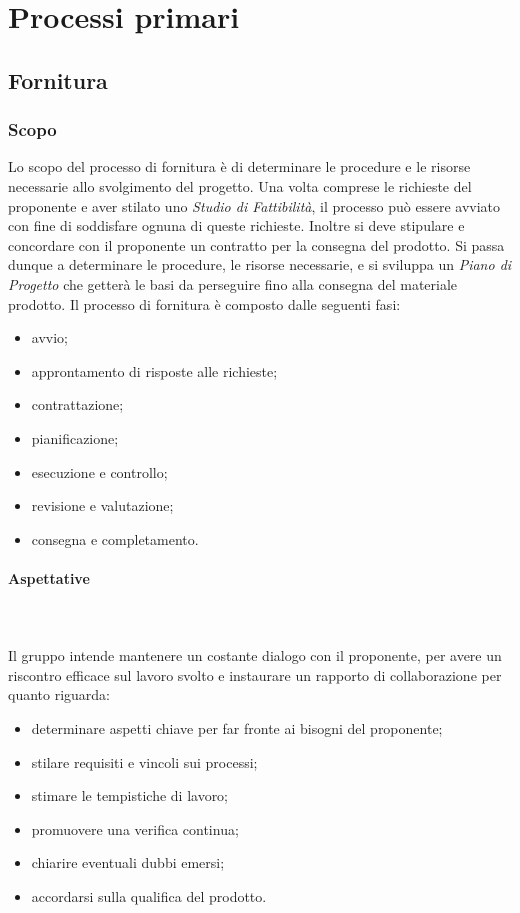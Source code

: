 \section{Processi primari}

\subsection{Fornitura}

\subsubsection{Scopo}
Lo scopo del processo di fornitura è di determinare le procedure e le risorse 
necessarie allo svolgimento del progetto. Una volta comprese le richieste del 
proponente e aver stilato uno \textit{Studio di Fattibilità}, il processo può 
essere avviato con fine di soddisfare ognuna di queste richieste. Inoltre si 
deve stipulare e concordare con il proponente un contratto per la consegna del 
prodotto. Si passa dunque a determinare le procedure, le risorse necessarie, e 
si sviluppa un \textit{Piano di Progetto} che getterà le basi da perseguire fino 
alla consegna del materiale prodotto.
Il processo di fornitura è composto dalle seguenti fasi:
	\begin{itemize}
		\item avvio;
		\item approntamento di risposte alle richieste;
		\item contrattazione;
		\item pianificazione;
		\item esecuzione e controllo;
		\item revisione e valutazione;
		\item consegna e completamento.
	\end{itemize}
	
\paragraph{Aspettative} \mbox{}\\ \mbox{}\\
Il gruppo intende mantenere un costante dialogo con il proponente, per avere un 
riscontro efficace sul lavoro svolto e instaurare un rapporto di collaborazione 
per quanto riguarda:
	\begin{itemize}
		\item determinare aspetti chiave per far fronte ai bisogni del proponente;
		\item stilare requisiti e vincoli sui processi;
		\item stimare le tempistiche di lavoro;
		\item promuovere una verifica continua;
		\item chiarire eventuali dubbi emersi;
		\item accordarsi sulla qualifica del prodotto.
	\end{itemize}
	
